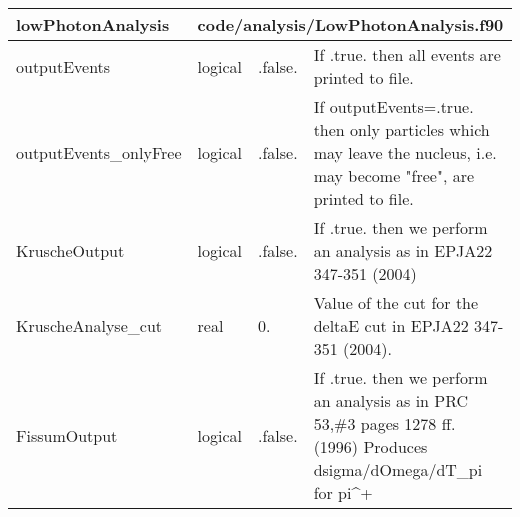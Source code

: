 \documentclass{article}
\begin{document}
\begin{longtable}{llll}
\toprule
\textbf{\large{lowPhotonAnalysis}} & \multicolumn{3}{l}{\footnotesize{code/analysis/LowPhotonAnalysis.f90}}\\*
\midrule
\endfirsthead
\midrule
\endhead
outputEvents & \begin{minipage}[t]{2cm}logical\end{minipage} & \begin{minipage}[t]{2cm}.false.\end{minipage} & \begin{minipage}[t]{12cm}If .true. then all events are printed to file.\end{minipage}\\*
\midrule
outputEvents\_onlyFree & \begin{minipage}[t]{2cm}logical\end{minipage} & \begin{minipage}[t]{2cm}.false.\end{minipage} & \begin{minipage}[t]{12cm}If outputEvents=.true. then only particles which may leave the nucleus, i.e. may become "free", are printed to file.\end{minipage}\\*
\midrule
KruscheOutput & \begin{minipage}[t]{2cm}logical\end{minipage} & \begin{minipage}[t]{2cm}.false.\end{minipage} & \begin{minipage}[t]{12cm}If .true. then we perform an analysis as in EPJA22 347-351 (2004)\end{minipage}\\*
\midrule
KruscheAnalyse\_cut & \begin{minipage}[t]{2cm}real\end{minipage} & \begin{minipage}[t]{2cm}0.\end{minipage} & \begin{minipage}[t]{12cm}Value of the cut for the deltaE cut in EPJA22 347-351 (2004).\end{minipage}\\*
\midrule
FissumOutput & \begin{minipage}[t]{2cm}logical\end{minipage} & \begin{minipage}[t]{2cm}.false.\end{minipage} & \begin{minipage}[t]{12cm}If .true. then we perform an analysis as in PRC 53,\#3 pages 1278 ff. (1996) Produces dsigma/dOmega/dT\_pi for pi\^{}+\end{minipage}\\*

\end{longtable}
\end{document}
